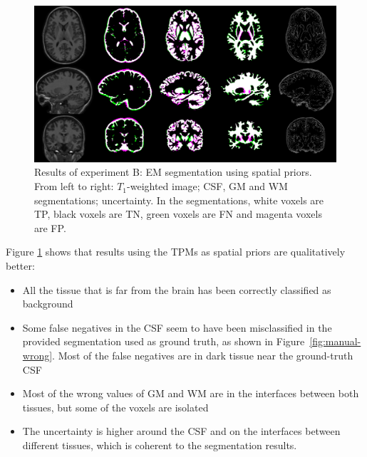 \begin{figure}
  \centering
  \includegraphics[width=\textwidth]{figures/experiment_b}
  \caption{Results of experiment B: EM segmentation using spatial priors. From left to right: $T_1$-weighted image; CSF, GM and WM segmentations; uncertainty. In the segmentations, white voxels are TP, black voxels are TN, green voxels are FN and magenta voxels are FP.}
  \label{fig:experiment-b}
\end{figure}

Figure \ref{fig:experiment-b} shows that results using the TPMs as spatial priors are qualitatively better:
\begin{itemize}
  \item All the tissue that is far from the brain has been correctly classified as background
  \item Some false negatives in the CSF seem to have been misclassified in the provided segmentation used as ground truth, as shown in Figure~\ref{fig:manual-wrong}. Most of the false negatives are in dark tissue near the ground-truth CSF
  \item Most of the wrong values of GM and WM are in the interfaces between both tissues, but some of the voxels are isolated
  \item The uncertainty is higher around the CSF and on the interfaces between different tissues, which is coherent to the segmentation results.
\end{itemize}



